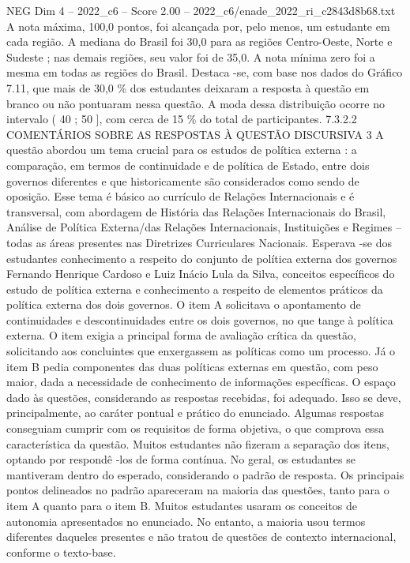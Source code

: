 \begin{textsample}{NEG Dim 4 – 2022\_c6 – Score 2.00 – 2022\_c6/enade\_2022\_ri\_c2843d8b68.txt}
A nota máxima, 100,0 pontos, foi alcançada por, pelo menos, um estudante em cada região.
A mediana do Brasil foi 30,0 para as regiões Centro-Oeste, Norte e Sudeste ; nas demais regiões, seu valor foi de 35,0.
A nota mínima zero foi a mesma em todas as regiões do Brasil.
Destaca -se, com base nos dados do Gráfico 7.11, que mais de 30,0 \% dos estudantes deixaram a resposta à questão em branco ou não pontuaram nessa questão.
A moda dessa distribuição ocorre no intervalo ( 40 ; 50 ], com cerca de 15 \% do total de participantes. 7.3.2.2 COMENTÁRIOS SOBRE AS RESPOSTAS À QUESTÃO DISCURSIVA 3 A questão abordou um tema crucial para os estudos de política externa : a comparação, em termos de continuidade e de política de Estado, entre dois governos diferentes e que historicamente são considerados como sendo de oposição.
Esse tema é básico ao currículo de Relações Internacionais e é transversal, com abordagem de História das Relações Internacionais do Brasil, Análise de Política Externa/das Relações Internacionais, Instituições e Regimes – todas as áreas presentes nas Diretrizes Curriculares Nacionais.
Esperava -se dos estudantes conhecimento a respeito do conjunto de política externa dos governos Fernando Henrique Cardoso e Luiz Inácio Lula da Silva, conceitos específicos do estudo de política externa e conhecimento a respeito de elementos práticos da política externa dos dois governos.
O item A solicitava o apontamento de continuidades e descontinuidades entre os dois governos, no que tange à política externa.
O item exigia a principal forma de avaliação crítica da questão, solicitando aos concluintes que enxergassem as políticas como um processo.
Já o item B pedia componentes das duas políticas externas em questão, com peso maior, dada a necessidade de conhecimento de informações específicas.
O espaço dado às questões, considerando as respostas recebidas, foi adequado.
Isso se deve, principalmente, ao caráter pontual e prático do enunciado.
Algumas respostas conseguiam cumprir com os requisitos de forma objetiva, o que comprova essa característica da questão.
Muitos estudantes não fizeram a separação dos itens, optando por respondê -los de forma contínua.
No geral, os estudantes se mantiveram dentro do esperado, considerando o padrão de resposta.
Os principais pontos delineados no padrão apareceram na maioria das questões, tanto para o item A quanto para o item B.
Muitos estudantes usaram os conceitos de autonomia apresentados no enunciado.
No entanto, a maioria usou termos diferentes daqueles presentes e não tratou de questões de contexto internacional, conforme o texto-base.

\end{textsample}
